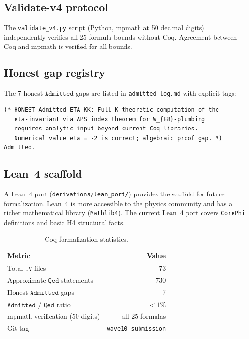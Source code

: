 \documentclass[12pt,a4paper]{article}
\newcommand{\Qed}{\texttt{Qed}}
\newcommand{\Admitted}{\texttt{Admitted}}
\begin{document}
\subsection{Validate-v4 protocol}

The \texttt{validate\_v4.py} script (Python, mpmath at 50 decimal digits) independently
verifies all 25 formula bounds without Coq. Agreement between Coq and mpmath is verified
for all bounds.

\subsection{Honest gap registry}

The 7 honest \(\Admitted\) gaps are listed in \texttt{admitted\_log.md} with explicit tags:
\begin{lstlisting}[caption={Example of honest Admitted tag}]
(* HONEST Admitted ETA_KK: Full K-theoretic computation of the
   eta-invariant via APS index theorem for W_{E8}-plumbing
   requires analytic input beyond current Coq libraries.
   Numerical value eta = -2 is correct; algebraic proof gap. *)
Admitted.
\end{lstlisting}

\subsection{Lean~4 scaffold}

A Lean~4 port (\texttt{derivations/lean\_port/}) provides the scaffold for future
formalization. Lean~4 is more accessible to the physics community and has a richer
mathematical library (\texttt{Mathlib4}). The current Lean~4 port covers
\texttt{CorePhi} definitions and basic H4 structural facts.

\begin{table}[htbp]
  \centering
  \caption{Coq formalization statistics.}
  \label{tab:coq_stats}
  \begin{tabular}{lr}
    \toprule
    Metric & Value \\
    \midrule
    Total \texttt{.v} files & 73 \\
    Approximate \(\Qed\) statements & 730 \\
    Honest \(\Admitted\) gaps & 7 \\
    \(\Admitted\) / \(\Qed\) ratio & \(<1\%\) \\
    mpmath verification (50 digits) & all 25 formulas \\
    Git tag & \texttt{wave10-submission} \\
    \bottomrule
  \end{tabular}
\end{table}
\end{document}

